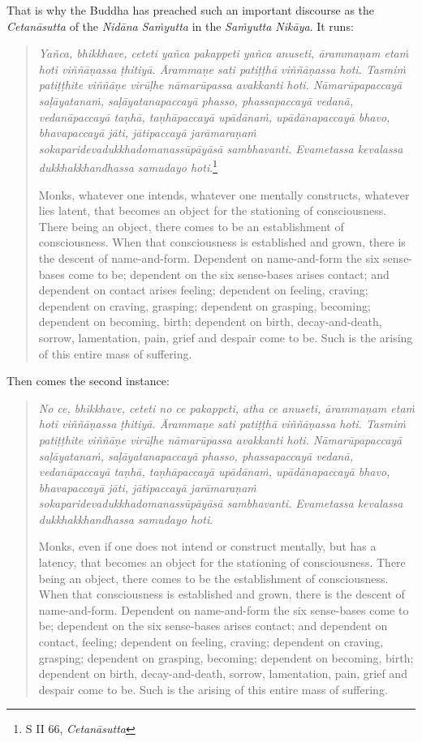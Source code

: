 That is why the Buddha has preached such an important discourse as the \emph{Cetanāsutta} of the \emph{Nidāna Saṁyutta} in the \emph{Saṁyutta Nikāya}. It runs:

\begin{quote}
\emph{Yañca, bhikkhave, ceteti yañca pakappeti yañca anuseti, ārammaṇam etaṁ hoti viññāṇassa ṭhitiyā. Ārammaṇe sati patiṭṭhā viññāṇassa hoti. Tasmiṁ patiṭṭhite viññāṇe virūḷhe nāmarūpassa avakkanti hoti. Nāmarūpapaccayā saḷāyatanaṁ, saḷāyatanapaccayā phasso, phassapaccayā vedanā, vedanāpaccayā taṇhā, taṇhāpaccayā upādānaṁ, upādānapaccayā bhavo, bhavapaccayā jāti, jātipaccayā jarāmaraṇaṁ sokaparidevadukkhadomanassūpāyāsā sambhavanti. Evametassa kevalassa dukkhakkhandhassa samudayo hoti}.\footnote{S II 66, \emph{Cetanāsutta}}

Monks, whatever one intends, whatever one mentally constructs, whatever lies latent, that becomes an object for the stationing of consciousness. There being an object, there comes to be an establishment of consciousness. When that consciousness is established and grown, there is the descent of name-and-form. Dependent on name-and-form the six sense-bases come to be; dependent on the six sense-bases arises contact; and dependent on contact arises feeling; dependent on feeling, craving; dependent on craving, grasping; dependent on grasping, becoming; dependent on becoming, birth; dependent on birth, decay-and-death, sorrow, lamentation, pain, grief and despair come to be. Such is the arising of this entire mass of suffering.
\end{quote}

Then comes the second instance:

\begin{quote}
\emph{No ce, bhikkhave, ceteti no ce pakappeti, atha ce anuseti, ārammaṇam etaṁ hoti viññāṇassa ṭhitiyā. Ārammaṇe sati patiṭṭhā viññāṇassa hoti. Tasmiṁ patiṭṭhite viññāṇe virūḷhe nāmarūpassa avakkanti hoti. Nāmarūpapaccayā saḷāyatanaṁ, saḷāyatanapaccayā phasso, phassapaccayā vedanā, vedanāpaccayā taṇhā, taṇhāpaccayā upādānaṁ, upādānapaccayā bhavo, bhavapaccayā jāti, jātipaccayā jarāmaraṇaṁ sokaparidevadukkhadomanassūpāyāsā sambhavanti. Evametassa kevalassa dukkhakkhandhassa samudayo hoti}.

Monks, even if one does not intend or construct mentally, but has a latency, that becomes an object for the stationing of consciousness. There being an object, there comes to be the establishment of consciousness. When that consciousness is established and grown, there is the descent of name-and-form. Dependent on name-and-form the six sense-bases come to be; dependent on the six sense-bases arises contact; and dependent on contact, feeling; dependent on feeling, craving; dependent on craving, grasping; dependent on grasping, becoming; dependent on becoming, birth; dependent on birth, decay-and-death, sorrow, lamentation, pain, grief and despair come to be. Such is the arising of this entire mass of suffering.
\end{quote}

